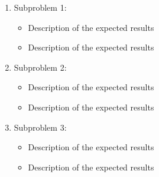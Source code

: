\begin{multicols}{2}
\begin{enumerate}
    \item Subproblem 1: 
        \begin{itemize}
            \item Description of the expected results
            \item Description of the expected results
        \end{itemize}
    \item Subproblem 2:
        \begin{itemize}
            \item Description of the expected results
            \item Description of the expected results
        \end{itemize}
    \item Subproblem 3:
        \begin{itemize}
            \item Description of the expected results
            \item Description of the expected results
        \end{itemize}
\end{enumerate}

\end{multicols}
\bigskip